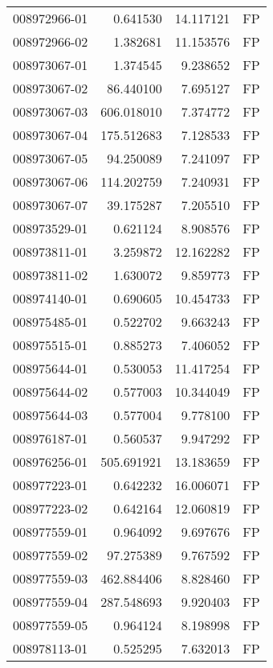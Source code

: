 \begin{tabular}{lrrl}
008972966-01 &    0.641530 &      14.117121 &   FP \\
008972966-02 &    1.382681 &      11.153576 &   FP \\
008973067-01 &    1.374545 &       9.238652 &   FP \\
008973067-02 &   86.440100 &       7.695127 &   FP \\
008973067-03 &  606.018010 &       7.374772 &   FP \\
008973067-04 &  175.512683 &       7.128533 &   FP \\
008973067-05 &   94.250089 &       7.241097 &   FP \\
008973067-06 &  114.202759 &       7.240931 &   FP \\
008973067-07 &   39.175287 &       7.205510 &   FP \\
008973529-01 &    0.621124 &       8.908576 &   FP \\
008973811-01 &    3.259872 &      12.162282 &   FP \\
008973811-02 &    1.630072 &       9.859773 &   FP \\
008974140-01 &    0.690605 &      10.454733 &   FP \\
008975485-01 &    0.522702 &       9.663243 &   FP \\
008975515-01 &    0.885273 &       7.406052 &   FP \\
008975644-01 &    0.530053 &      11.417254 &   FP \\
008975644-02 &    0.577003 &      10.344049 &   FP \\
008975644-03 &    0.577004 &       9.778100 &   FP \\
008976187-01 &    0.560537 &       9.947292 &   FP \\
008976256-01 &  505.691921 &      13.183659 &   FP \\
008977223-01 &    0.642232 &      16.006071 &   FP \\
008977223-02 &    0.642164 &      12.060819 &   FP \\
008977559-01 &    0.964092 &       9.697676 &   FP \\
008977559-02 &   97.275389 &       9.767592 &   FP \\
008977559-03 &  462.884406 &       8.828460 &   FP \\
008977559-04 &  287.548693 &       9.920403 &   FP \\
008977559-05 &    0.964124 &       8.198998 &   FP \\
008978113-01 &    0.525295 &       7.632013 &   FP \\

\end{tabular}
